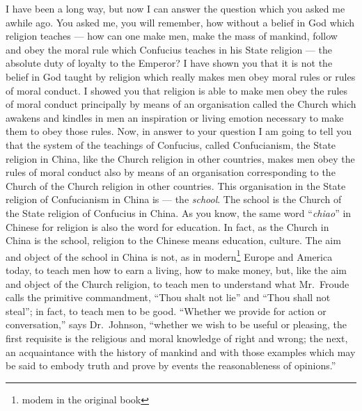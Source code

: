 I have been a long way, but now I can answer the question which you asked me awhile ago.
You asked me, you will remember, how without a belief in God which religion teaches --- how can one make men, make the mass of mankind, follow and obey the moral rule which Confucius teaches in his State religion --- the absolute duty of loyalty to the Emperor?
I have shown you that it is not the belief in God taught by religion which really makes men obey moral rules or rules of moral conduct.
I showed you that religion is able to make men obey the rules of moral conduct principally by means of an organisation called the Church which awakens and kindles in men an inspiration or living emotion necessary to make them to obey those rules.
Now, in answer to your question I am going to tell you that the system of the teachings of Confucius, called Confucianism, the State religion in China, like the Church religion in other countries, makes men obey the rules of moral conduct also by means of an organisation corresponding to the Church of the Church religion in other countries.
This organisation in the State religion of Confucianism in China is --- the \emph{school}.
The school is the Church of the State religion of Confucius in China.
As you know, the same word ``\emph{chiao}'' in Chinese for religion is also the word for education.
In fact, as the Church in China is the school, religion to the Chinese means education, culture.
The aim and object of the school in China is not, as in modern\footnote{modem in the original book} Europe and America today, to teach men how to earn a living, how to make money, but, like the aim and object of the Church religion, to teach men to understand what Mr.~Froude calls the primitive commandment, ``Thou shalt not lie'' and ``Thou shall not steal''; in fact, to teach men to be good.
``Whether we provide for action or conversation,'' says Dr.~Johnson, ``whether we wish to be useful or pleasing, the first requisite is the religious and moral knowledge of right and wrong; the next, an acquaintance with the history of mankind and with those examples which may be said to embody truth and prove by events the reasonableness of opinions.''

